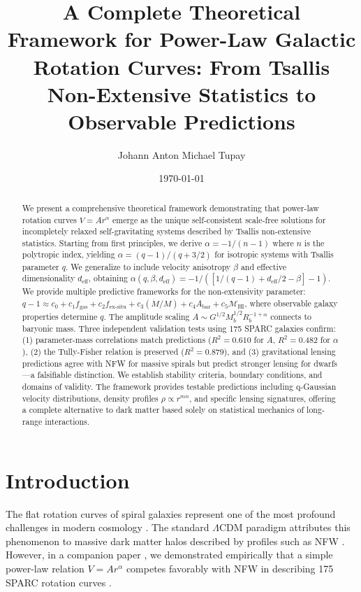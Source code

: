 \documentclass[12pt, a4paper]{article}
\title{\textbf{A Complete Theoretical Framework for Power-Law Galactic Rotation Curves: From Tsallis Non-Extensive Statistics to Observable Predictions}}
\author[1]{Johann Anton Michael Tupay}
\affil[1]{London, United Kingdom}
\date{\today}
\theoremstyle{definition}
\theoremstyle{remark}
\begin{document}
\maketitle

\begin{abstract}
We present a comprehensive theoretical framework demonstrating that power-law rotation curves $V = Ar^\alpha$ emerge as the unique self-consistent scale-free solutions for incompletely relaxed self-gravitating systems described by Tsallis non-extensive statistics. Starting from first principles, we derive $\alpha = -1/(n-1)$ where $n$ is the polytropic index, yielding $\alpha = (q-1)/(q+3/2)$ for isotropic systems with Tsallis parameter $q$. We generalize to include velocity anisotropy $\beta$ and effective dimensionality $d_{\text{eff}}$, obtaining $\alpha(q,\beta,d_{\text{eff}}) = -1/([1/(q-1) + d_{\text{eff}}/2 - \beta] - 1)$. We provide multiple predictive frameworks for the non-extensivity parameter: $q - 1 \approx c_0 + c_1 f_{\text{gas}} + c_2 f_{\text{ex-situ}} + c_3(\dot{M}/M) + c_4 A_{\text{bar}} + c_5 \mathcal{M}_{\text{HI}}$, where observable galaxy properties determine $q$. The amplitude scaling $A \sim G^{1/2}M_b^{1/2}R_b^{-1+\alpha}$ connects to baryonic mass. Three independent validation tests using 175 SPARC galaxies confirm: (1) parameter-mass correlations match predictions ($R^2 = 0.610$ for $A$, $R^2 = 0.482$ for $\alpha$), (2) the Tully-Fisher relation is preserved ($R^2 = 0.879$), and (3) gravitational lensing predictions agree with NFW for massive spirals but predict stronger lensing for dwarfs—a falsifiable distinction. We establish stability criteria, boundary conditions, and domains of validity. The framework provides testable predictions including q-Gaussian velocity distributions, density profiles $\rho \propto r^{mn}$, and specific lensing signatures, offering a complete alternative to dark matter based solely on statistical mechanics of long-range interactions.
\end{abstract}

\section{Introduction}

The flat rotation curves of spiral galaxies represent one of the most profound challenges in modern cosmology \cite{Rubin1980, Sofue2001}. The standard $\Lambda$CDM paradigm attributes this phenomenon to massive dark matter halos described by profiles such as NFW \cite{Navarro1997}. However, in a companion paper \cite{Tupay2025a}, we demonstrated empirically that a simple power-law relation $V = Ar^\alpha$ competes favorably with NFW in describing 175 SPARC rotation curves \cite{Lelli2016}.
\end{document}
